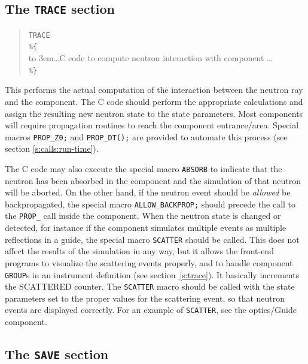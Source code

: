 \subsection{The \texttt{TRACE} section}
\label{s:comp-trace}

\begin{quote}
  \texttt{TRACE} \\
  \verb|%{| \\
  \hbox to 3em{}\ldots C code to compute neutron interaction with
    component \ldots \\
  \verb|%}|
\end{quote}
This performs the actual computation of the interaction between the
neutron ray and the component. The C code should perform the appropriate
calculations and assign the resulting new neutron state to the state
parameters. Most components will require propagation routines to reach the component entrance/area. Special macros \verb+PROP_Z0;+ and \verb+PROP_DT();+ are provided to automate this process (see section \ref{s:calls:run-time}).

The C code may also execute the special macro \texttt{ABSORB} to indicate
that the neutron has been absorbed in the component and the simulation of
that neutron will be aborted. On the other hand, if the neutron event
should be \emph{allowed} be backpropagated, the special macro
\verb+ALLOW_BACKPROP;+ should precede the call to the \verb+PROP_+
call inside the component.
When the neutron state is changed or detected, for
instance if the component simulates multiple events as multiple
reflections in a guide, the
special macro \texttt{SCATTER} should be called. This does not affect the
results of the simulation in any way, but it allows the front-end
programs to visualize the scattering events properly, and to handle
component \texttt{GROUP}s in an instrument definition (see
section~\ref{s:trace}). It basically increments the SCATTERED counter. The \texttt{SCATTER} macro should be called with
the state parameters set to the proper values for the scattering event, so that neutron events are displayed correctly.
For an example of \texttt{SCATTER}, see the optics/Guide
component. 


\subsection{The \texttt{SAVE} section}
\label{s:comp-save}

